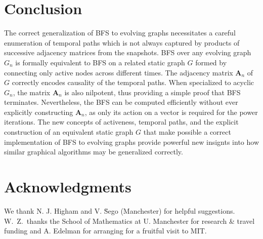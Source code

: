 \documentclass[10pt,conference,compsocconf]{IEEEtran}
\theoremstyle{definition}
\begin{document}
\section{Conclusion}

The correct generalization of BFS to evolving graphs necessitates a careful
enumeration of temporal paths which is not always captured by products of
successive adjacency matrices from the snapshots. BFS over any evolving graph $G_n$
is formally equivalent to BFS on a related static graph $G$ formed by connecting only
active nodes across different times. The adjacency matrix $\bm A_n$ of $G$ correctly
encodes causality of the temporal paths. When specialized to acyclic $G_n$, the matrix
$\bm A_n$ is also nilpotent, thus providing a simple proof that BFS terminates.
Nevertheless, the BFS can be computed efficiently without ever explicitly constructing
$\bm A_n$, as only its action on a vector is required for the power iterations.
The new concepts of activeness, temporal paths, and the explicit construction of
an equivalent static graph $G$ that make possible a correct implementation of BFS
to evolving graphs provide powerful new insignts into how similar graphical
algorithms may be generalized correctly.


\section*{Acknowledgments}

We thank N. J. Higham and V. \u Sego (Manchester) for helpful suggestions.
W.\ Z.\ thanks the School of Mathematics at U. Manchester for research \& travel funding and
A. Edelman for arranging for a fruitful visit to MIT.
\end{document}
